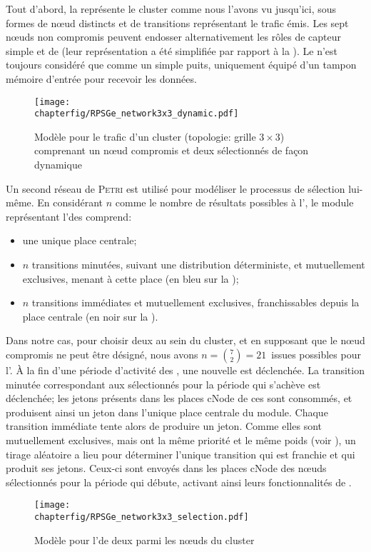 Tout d'abord, la  représente le cluster comme nous l'avons vu jusqu'ici, sous formes de nœud distincts et de transitions représentant le trafic émis.
Les sept nœuds non compromis peuvent endosser alternativement les rôles de capteur simple et de \cn (leur représentation a été simplifiée par rapport à la ).
Le \ch n'est toujours considéré que comme un simple puits, uniquement équipé d'un tampon mémoire d'entrée pour recevoir les données.
\begin{figure}[!b]
    \centering
    \texttt{[image: \\chapterfig/RPSGe\_network3x3\_dynamic.pdf]}
    \caption{Modèle \rpsge pour le trafic d'un cluster (topologie: grille $3\times3$) comprenant un nœud compromis et deux \cns sélectionnés de façon dynamique}\label{sa:fig:petridyn}
\end{figure}

Un second réseau de \textsc{Petri} est utilisé pour modéliser le processus de sélection lui-même.
En considérant $n$ comme le nombre de résultats possibles à l'\election, le module représentant l'\elecdyn des \cns comprend:
\begin{itemize}
    \item une unique place centrale;
    \item $n$ transitions minutées, suivant une distribution déterministe, et mutuellement exclusives, menant à cette place (en bleu sur la );
    \item $n$ transitions immédiates et mutuellement exclusives, franchissables depuis la place centrale (en noir sur la ).
\end{itemize}
Dans notre cas, pour choisir deux \cns au sein du cluster, et en supposant que le nœud compromis ne peut être désigné, nous avons $n=\binom{7}{2}=21$~issues possibles pour l'\election.
À la fin d'une période d'activité des \cns, une nouvelle \election est déclenchée.
La transition minutée correspondant aux \cns sélectionnés pour la période qui s'achève est déclenchée; les jetons présents dans les places \textsf{cNode} de ces \cns sont consommés, et produisent ainsi un jeton dans l'unique place centrale du module.
Chaque transition immédiate tente alors de produire un jeton.
Comme elles sont mutuellement exclusives, mais ont la même priorité et le même poids (voir ), un tirage aléatoire a lieu pour déterminer l'unique transition qui est franchie et qui produit ses jetons.
Ceux-ci sont envoyés dans les places \textsf{cNode} des nœuds sélectionnés pour la période qui débute, activant ainsi leurs fonctionnalités de \cns.
\begin{figure}[!ht]
    \centering
    \texttt{[image: \\chapterfig/RPSGe\_network3x3\_selection.pdf]}
    \caption{Modèle \rpsge pour l'\elecdyn de deux \cns parmi les nœuds du cluster}\label{sa:fig:petrielec}
\end{figure}
